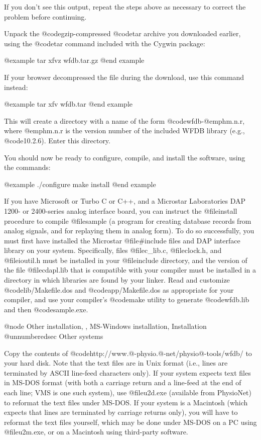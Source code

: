 {{{{{{{{{If you don't see this output, repeat the steps above as necessary to correct
the problem before continuing.

Unpack the @code{gzip}-compressed @code{tar} archive you downloaded earlier,
using the @code{tar} command included with the Cygwin package:

@example
tar xfvz wfdb.tar.gz
@end example

If your browser decompressed the file during the download, use this command
instead:

@example
tar xfv wfdb.tar
@end example

This will create a directory with a name of the form @code{wfdb-}@emph{m.n.r},
where @emph{m.n.r} is the version number of the included WFDB library (e.g.,
@code{10.2.6}).  Enter this directory.

You should now be ready to configure, compile, and install the software, using
the commands:

@example
./configure
make install
@end example

If you have Microsoft or Turbo C or C++, and a Microstar Laboratories DAP 1200-
or 2400-series analog interface board, you can instruct the @file{install}
procedure to compile @file{sample} (a program for creating database records
from analog signals, and for replaying them in analog form).  To do so
successfully, you must first have installed the Microstar @file{#include} files
and DAP interface library on your system.  Specifically, files @file{c_lib.c},
@file{clock.h}, and @file{ioutil.h} must be installed in your @file{include}
directory, and the version of the file @file{cdapl.lib} that is compatible with
your compiler must be installed in a directory in which libraries are found by
your linker.  Read and customize @code{lib/Makefile.dos} and
@code{app/Makefile.dos} as appropriate for your compiler, and use your
compiler's @code{make} utility to generate @code{wfdb.lib} and then
@code{sample.exe}.


@node Other installation, , MS-Windows installation, Installation
@unnumberedsec Other systems

Copy the contents of @code{http://www.@-physio.@-net/physio@-tools/wfdb/} to
your hard disk.  Note that the text files are in Unix format (i.e., lines are
terminated by ASCII line-feed characters only).  If your system expects text
files in MS-DOS format (with both a carriage return and a line-feed at the end
of each line; VMS is one such system), use @file{u2d.exe} (available from
PhysioNet) to reformat the text files under MS-DOS.  If your
system is a Macintosh (which expects that lines are terminated by carriage
returns only), you will have to reformat the text files yourself, which may be
done under MS-DOS on a PC using @file{u2m.exe}, or on a Macintosh using
third-party software.

}}}}}}}}}
